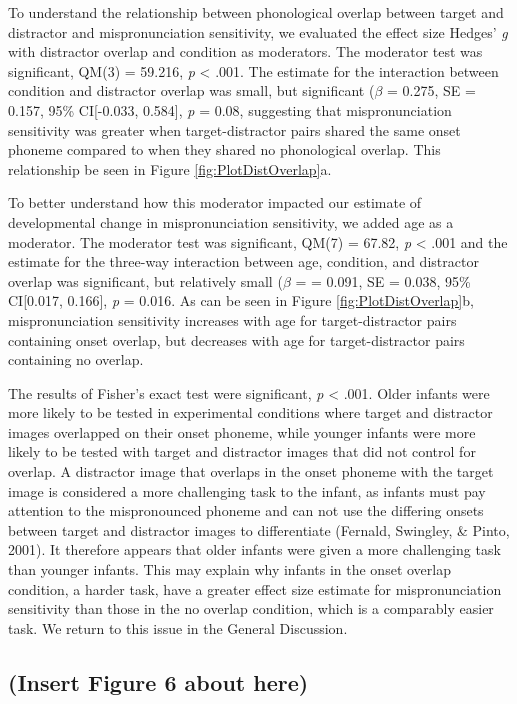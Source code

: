 \documentclass[man]{apa6}
\theoremstyle{definition}
\theoremstyle{definition}
\theoremstyle{definition}
\theoremstyle{remark}
\begin{document}
To understand the relationship between phonological overlap between
target and distractor and mispronunciation sensitivity, we evaluated the
effect size Hedges' \emph{g} with distractor overlap and condition as
moderators. The moderator test was significant, QM(3) = 59.216, \emph{p}
\textless{} .001. The estimate for the interaction between condition and
distractor overlap was small, but significant (\(\beta\) = 0.275, SE =
0.157, 95\% CI{[}-0.033, 0.584{]}, \emph{p} = 0.08, suggesting that
mispronunciation sensitivity was greater when target-distractor pairs
shared the same onset phoneme compared to when they shared no
phonological overlap. This relationship be seen in Figure
\ref{fig:PlotDistOverlap}a.

To better understand how this moderator impacted our estimate of
developmental change in mispronunciation sensitivity, we added age as a
moderator. The moderator test was significant, QM(7) = 67.82, \emph{p}
\textless{} .001 and the estimate for the three-way interaction between
age, condition, and distractor overlap was significant, but relatively
small (\(\beta\) = = 0.091, SE = 0.038, 95\% CI{[}0.017, 0.166{]},
\emph{p} = 0.016. As can be seen in Figure \ref{fig:PlotDistOverlap}b,
mispronunciation sensitivity increases with age for target-distractor
pairs containing onset overlap, but decreases with age for
target-distractor pairs containing no overlap.

The results of Fisher's exact test were significant, \emph{p}
\textless{} .001. Older infants were more likely to be tested in
experimental conditions where target and distractor images overlapped on
their onset phoneme, while younger infants were more likely to be tested
with target and distractor images that did not control for overlap. A
distractor image that overlaps in the onset phoneme with the target
image is considered a more challenging task to the infant, as infants
must pay attention to the mispronounced phoneme and can not use the
differing onsets between target and distractor images to differentiate
(Fernald, Swingley, \& Pinto, 2001). It therefore appears that older
infants were given a more challenging task than younger infants. This
may explain why infants in the onset overlap condition, a harder task,
have a greater effect size estimate for mispronunciation sensitivity
than those in the no overlap condition, which is a comparably easier
task. We return to this issue in the General Discussion.

\subsection{(Insert Figure 6 about
here)}\label{insert-figure-6-about-here}
\end{document}
